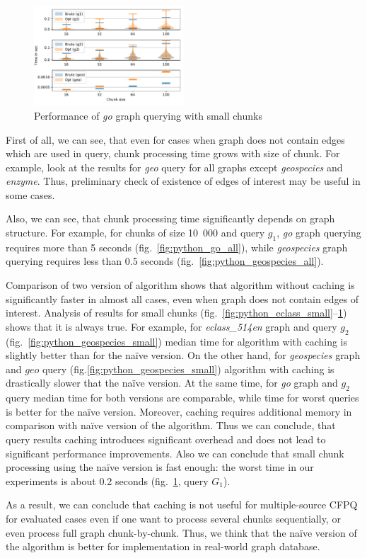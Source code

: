 \begin{figure}[h]
\centering
\includegraphics[width=0.5\textwidth]{data/raw/go_4.pdf}
\caption{Performance of \textit{go} graph querying with small chunks}
\label{fig:python_go_small}
\end{figure}


First of all, we can see, that even for cases when graph does not contain edges which are used in query, chunk processing time grows with size of chunk.
For example, look at the results for \textit{geo} query for all graphs except \textit{geospecies} and \textit{enzyme}.
Thus, preliminary check of existence of edges of interest may be useful in some cases.

Also, we can see, that chunk processing time significantly depends on graph structure.
For example, for chunks of size 10~000 and query $g_1$, \textit{go} graph querying requires more than 5 seconds (fig.~\ref{fig:python_go_all}), while \textit{geospecies} graph querying requires less than 0.5 seconds (fig.~\ref{fig:python_geospecies_all}).

Comparison of two version of algorithm shows that algorithm without caching is significantly faster in almost all cases, even when graph does not contain edges of interest.
Analysis of results for small chunks (fig.~\ref{fig:python_eclass_small}--\ref{fig:python_go_small}) shows that it is always true.
For example, for \textit{eclass\_514en} graph and query $g_2$ (fig.~\ref{fig:python_geospecies_small}) median time for algorithm with caching is slightly better than for the na\"{i}ve version.
On the other hand, for \textit{geospecies} graph and $geo$ query (fig.\ref{fig:python_geospecies_small}) algorithm with caching is drastically slower that the na\"{i}ve version.
At the same time, for \textit{go} graph and $g_2$ query median time for both versions are comparable, while time for worst queries is better for the na\"{i}ve version.
Moreover, caching requires additional memory in comparison with na\"{i}ve version of the algorithm.
Thus we can conclude, that query results caching introduces significant overhead and does not lead to significant performance improvements.
Also we can conclude that small chunk processing using the na\"{i}ve version is fast enough: the worst time in our experiments is about 0.2 seconds (fig.~\ref{fig:python_go_small}, query $G_1$).


As a result, we can conclude that caching is not useful for multiple-source CFPQ for evaluated cases even if one want to process several chunks sequentially, or even process full graph chunk-by-chunk.
Thus, we think that the na\"{i}ve version of the algorithm is better for implementation in real-world graph database.



